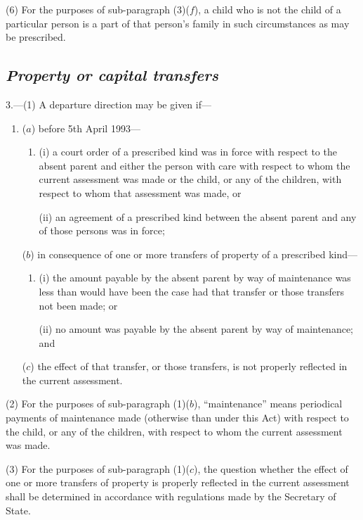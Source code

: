 \documentclass[12pt,a4paper]{article}
\begin{document}
(6) For the purposes of sub-paragraph (3)($f$), a child who is not the child of a particular person is a part of that person’s family in such circumstances as may be prescribed.

\subsection*{\itshape Property or capital transfers}

3.---(1) A departure direction may be given if—
\begin{enumerate}\item[]
($a$) before 5th April 1993—
\begin{enumerate}\item[]
(i) a court order of a prescribed kind was in force with respect to the absent parent and either the person with care with respect to whom the current assessment was made or the child, or any of the children, with respect to whom that assessment was made, or

(ii) an agreement of a prescribed kind between the absent parent and any of those persons was in force;
\end{enumerate}

($b$) in consequence of one or more transfers of property of a prescribed kind—
\begin{enumerate}\item[]
(i) the amount payable by the absent parent by way of maintenance was less than would have been the case had that transfer or those transfers not been made; or

(ii) no amount was payable by the absent parent by way of maintenance; and
\end{enumerate}

($c$) the effect of that transfer, or those transfers, is not properly reflected in the current assessment.
\end{enumerate}

(2) For the purposes of sub-paragraph (1)($b$), “maintenance” means periodical payments of maintenance made (otherwise than under this Act) with respect to the child, or any of the children, with respect to whom the current assessment was made.

(3) For the purposes of sub-paragraph (1)($c$), the question whether the effect of one or more transfers of property is properly reflected in the current assessment shall be determined in accordance with regulations made by the Secretary of State.

\medskip
\end{document}
